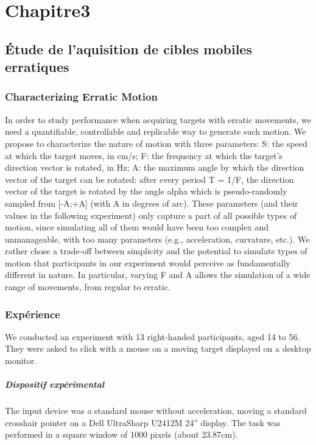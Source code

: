 
\chapter[Chapitre3]{Chapitre3}
\minitoc
\label{chap3}
\cleardoublepage



\section{Étude de l'aquisition de cibles mobiles erratiques}

\subsection{Characterizing Erratic Motion}
In order to study performance when acquiring targets with erratic movements, we
need a quantifiable, controllable and replicable way to generate such motion. We
propose to characterize the nature of motion with three parameters:
 S: the speed at which the target moves, in cm/s;
 F: the frequency at which the target's direction vector is rotated, in Hz;
 A: the maximum angle by which the direction vector of the target can be rotated:
after every period T = 1/F, the direction vector of the target is rotated by the angle
alpha which is pseudo-randomly sampled from [-A;+A] (with A in degrees of arc).
These parameters (and their values in the following experiment) only capture a part
of all possible types of motion, since simulating all of them would have been too
complex and unmanageable, with too many parameters (e.g., acceleration, curvature,
etc.). We rather chose a trade-off between simplicity and the potential to simulate
types of motion that participants in our experiment would perceive as fundamentally
different in nature. In particular, varying F and A allows the simulation of a wide
range of movements, from regular to erratic.

\subsection{Expérience}
We conducted an experiment with 13 right-handed participants, aged 14 to 56. They
were asked to click with a mouse on a moving target displayed on a desktop monitor.

\paragraph{Dispositif expérimental}
The input device was a standard mouse without acceleration, moving a
standard crosshair pointer on a Dell UltraSharp U2412M 24” display. The task was
performed in a square window of 1000 pixels (about 23.87cm).


